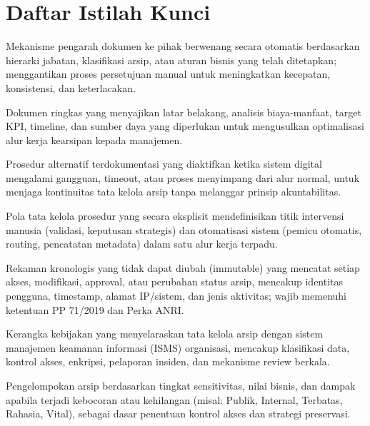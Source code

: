 \documentclass[12pt,a4paper]{report}
\begin{document}
\newpage
\chapter*{Daftar Istilah Kunci}

\begin{description}[leftmargin=!, labelwidth=\widthof{\textbf{Penanganan Pengecualian}}, labelsep=1em, itemsep=8pt]

\item[\textbf{Alur Persetujuan Digital}] Mekanisme pengarah dokumen ke pihak berwenang secara otomatis berdasarkan hierarki jabatan, klasifikasi arsip, atau aturan bisnis yang telah ditetapkan; menggantikan proses persetujuan manual untuk meningkatkan kecepatan, konsistensi, dan keterlacakan.

\item[\textbf{Business Case}] Dokumen ringkas yang menyajikan latar belakang, analisis biaya-manfaat, target KPI, timeline, dan sumber daya yang diperlukan untuk mengusulkan optimalisasi alur kerja kearsipan kepada manajemen.

\item[\textbf{Exception Handling \& Fallback}] Prosedur alternatif terdokumentasi yang diaktifkan ketika sistem digital mengalami gangguan, timeout, atau proses menyimpang dari alur normal, untuk menjaga kontinuitas tata kelola arsip tanpa melanggar prinsip akuntabilitas.

\item[\textbf{Human-System Orchestration}] Pola tata kelola prosedur yang secara eksplisit mendefinisikan titik intervensi manusia (validasi, keputusan strategis) dan otomatisasi sistem (pemicu otomatis, routing, pencatatan metadata) dalam satu alur kerja terpadu.

\item[\textbf{Jejak Audit (Audit Trail)}] Rekaman kronologis yang tidak dapat diubah (immutable) yang mencatat setiap akses, modifikasi, approval, atau perubahan status arsip, mencakup identitas pengguna, timestamp, alamat IP/sistem, dan jenis aktivitas; wajib memenuhi ketentuan PP 71/2019 dan Perka ANRI.

\item[\textbf{Kebijakan Keamanan Terintegrasi}] Kerangka kebijakan yang menyelaraskan tata kelola arsip dengan sistem manajemen keamanan informasi (ISMS) organisasi, mencakup klasifikasi data, kontrol akses, enkripsi, pelaporan insiden, dan mekanisme review berkala.

\item[\textbf{Klasifikasi Informasi Arsip}] Pengelompokan arsip berdasarkan tingkat sensitivitas, nilai bisnis, dan dampak apabila terjadi kebocoran atau kehilangan (misal: Publik, Internal, Terbatas, Rahasia, Vital), sebagai dasar penentuan kontrol akses dan strategi preservasi.


\end{description}
\end{document}
